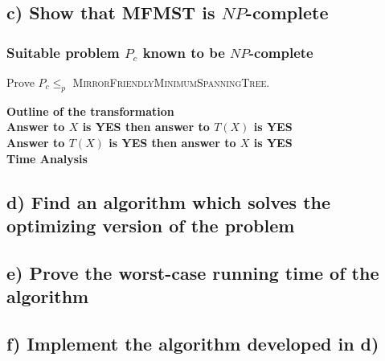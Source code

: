\documentclass[12pt]{article}
\begin{document}
\subsection*{c) Show that MFMST is $NP$-complete}
\subsubsection*{Suitable problem $P_c$ known to be $NP$-complete}

Prove $P_c \leq_p$ \textsc{MirrorFriendlyMinimumSpanningTree}.

\textbf{Outline of the transformation}\\

\textbf{Answer to $X$ is YES then answer to $T(X)$ is YES}\\

\textbf{Answer to $T(X)$ is YES then answer to $X$ is YES}\\

\textbf{Time Analysis}

\subsection*{d) Find an algorithm which solves the optimizing version of the problem}


\subsection*{e) Prove the worst-case running time of the algorithm}


\subsection*{f) Implement the algorithm developed in d)}
\end{document}
